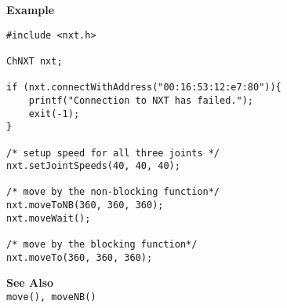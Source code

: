 \noindent
{\bf Example}
\begin{lstlisting}
#include <nxt.h> 

ChNXT nxt;

if (nxt.connectWithAddress("00:16:53:12:e7:80")){
    printf("Connection to NXT has failed.");
    exit(-1);
}
 
/* setup speed for all three joints */
nxt.setJointSpeeds(40, 40, 40);

/* move by the non-blocking function*/
nxt.moveToNB(360, 360, 360);
nxt.moveWait();

/* move by the blocking function*/
nxt.moveTo(360, 360, 360);
\end{lstlisting}

\noindent
{\bf See Also}\\
{\tt move(), moveNB()}\\
